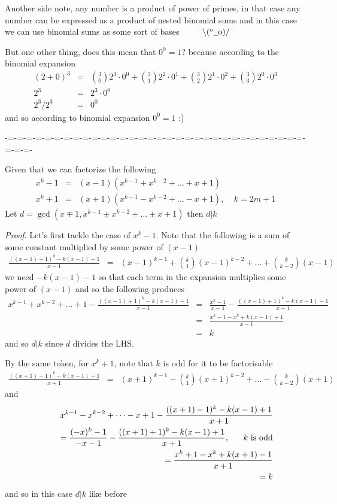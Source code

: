 \documentclass[aps,preprint,preprintnumbers,nofootinbib,showpacs,prd]{revtex4-1}
\newcommand{\nbea}{\begin{eqnarray*}}
\newcommand{\neea}{\end{eqnarray*}}
\newcommand{\dunno}{$ {}^{\mbox {--}}\backslash(^{\rm o}{}\underline{\hspace{0.2cm}}{\rm o})/^{\mbox {--}}$}
\begin{document}
Another side note, any number is a product of power of primes, in that case any number can be expressed as a product of nested binomial sums and in this case we can use binomial sums as some sort of bases ~~~ \dunno

But one other thing, does this mean that $0^0 = 1$? because according to the binomial expansion
%
\nbea
(2 + 0)^3 & = & \binom{3}{0}2^3 \cdot0^0 + \binom{3}{1}2^2 \cdot 0^1 + \binom{3}{2}2^1 \cdot 0^2 + \binom{3}{3}2^0 \cdot 0^3  \\
2^3 & = & 2^3 \cdot0^0 \\
2^3/2^3 & = & 0^0
\neea
%
and so according to binomial expansion $0^0 = 1$ :)


-=-=-=-=-=-=-=-=-=-=-=-=-=-=-=-=-=-=-=-=-=-=-=-=-=-=-=-=-=-=-=-=-=-=-=-

Given that we can factorize the following
%
\nbea
x^k - 1 & = & (x-1)(x^{k-1} + x^{k-2} + \dots + x + 1) \\
x^k + 1 & = & (x+1)(x^{k-1} - x^{k-2} + \dots - x + 1), ~~~~~ k = 2m+1
\neea
%
Let $d = \gcd(x\mp1,x^{k-1} \pm x^{k-2} + \dots \pm x + 1)$ then $d|k$

{\it Proof}. Let's first tackle the case of $x^k - 1$. Note that the following is a sum of some constant multiplied by some power of $(x-1)$
%
\nbea
\frac{((x-1) + 1)^k - k(x-1)- 1}{x-1} & = & (x-1)^{k-1} + \binom{k}{1}(x-1)^{k-2} + \dots + \binom{k}{k-2}(x-1)
\neea
%
we need $-k(x-1) - 1$ so that each term in the expansion multiplies some power of $(x-1)$ and so the following produces
%
\nbea
x^{k-1} + x^{k-2} + \dots + 1 - \frac{((x-1) + 1)^k - k(x-1)- 1}{x-1} & = & \frac{x^k - 1}{x-1} - \frac{((x-1) + 1)^k - k(x-1)- 1}{x-1} \\
& = & \frac{x^k - 1 - x^k + k(x-1) + 1}{x-1} \\
& = & k
\neea
%
and so $d|k$ since $d$ divides the LHS.

By the same token, for $x^k + 1$, note that $k$ is odd for it to be factorisable 
%
\nbea
\frac{((x+1) - 1)^k - k(x-1) + 1}{x+1} & = & (x+1)^{k-1} - \binom{k}{1}(x+1)^{k-2} + \dots - \binom{k}{k-2}(x+1)
\neea
%
and
%
\nbea
&& x^{k-1} - x^{k-2} + \dots - x + 1 - \frac{((x+1) - 1)^k - k(x-1) + 1}{x+1} \\
&& ~~~~~ = \frac{(-x)^k - 1}{-x-1} - \frac{((x+1) + 1)^k - k(x-1)+ 1}{x+1}, ~~~~~ k {\rm ~is~odd} \\
&& ~~~~~ = \frac{x^k + 1 - x^k + k(x+1) - 1}{x+1} \\
&& ~~~~~ = k
\neea
%
and so in this case $d|k$ like before
\end{document}
